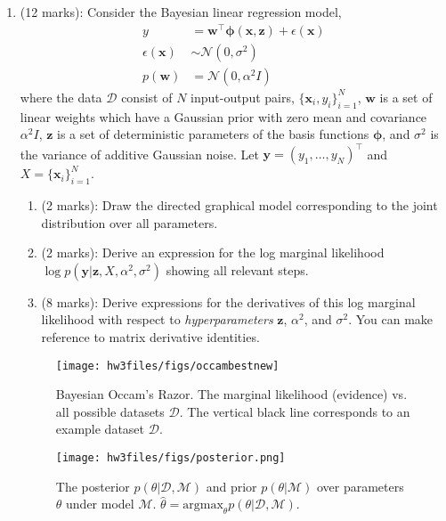 \documentclass[11pt]{article}
\newcommand{\mbf}[1]{{\boldsymbol{\mathbf{#1}}}}
\renewcommand{\bm}{\mbf}
\begin{document}
\begin{enumerate}
\item (12 marks): Consider the Bayesian linear regression model, 
\begin{align}
y &= \bm{w}^{\top} \bm{\phi}(\bm{x},\bm{z}) + \epsilon(\bm{x})   \\
\epsilon(\bm{x}) &\sim \mathcal{N}(0,\sigma^2) \\
p(\bm{w}) &= \mathcal{N}(0,\alpha^2 I) 
\end{align}
where the data $\mathcal{D}$ consist of $N$ input-output pairs, $\{\bm{x}_i, y_i\}_{i=1}^{N}$, $\bm{w}$ is a set of linear weights which have a Gaussian prior with zero mean and covariance $\alpha^2 I$, $\bm{z}$ is a set of deterministic parameters of the basis functions $\bm{\phi}$, and $\sigma^2$ is the variance of additive Gaussian noise.  Let 
$\bm{y} = (y_1,\dots,y_N)^{\top}$ and $X = \{\bm{x}_i\}_{i=1}^{N}$.  
\begin{enumerate}[label=(\alph*)]
 \item (2 marks): Draw the directed graphical model corresponding to the joint distribution over all parameters. 
\item (2 marks): Derive an expression for the log marginal likelihood $\log p(\bm{y} | \bm{z}, X, \alpha^2, \sigma^2)$ showing all relevant steps. 
\item (8 marks): Derive expressions for the derivatives of this log marginal likelihood with respect to \emph{hyperparameters} $\bm{z}$, $\alpha^2$, and $\sigma^2$.  You can make reference to matrix derivative identities.
\end{enumerate}

\begin{figure}[t!]
\centering
\texttt{[image: hw3files/figs/occambestnew]}
\caption{Bayesian Occam's Razor.  The marginal
likelihood (evidence) vs. all possible datasets $\mathcal{D}$.  The vertical black line corresponds to an 
example dataset $\mathcal{D}$.}
\label{fig: occam}
\end{figure}

\begin{figure}[t!]
\centering
\texttt{[image: hw3files/figs/posterior.png]}
\caption{The posterior $p(\theta|\mathcal{D},\mathcal{M})$ and prior $p(\theta | \mathcal{M})$ over parameters $\theta$ under model $\mathcal{M}$.  
$\hat{\theta} = \text{argmax}_{\theta} 
p(\theta|\mathcal{D},\mathcal{M})$. }
\label{fig: posterior}
\end{figure}



\end{enumerate}
\end{document}
